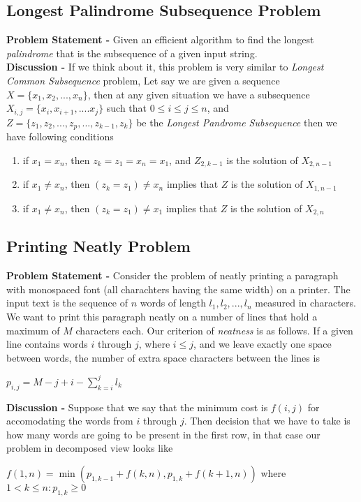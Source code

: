 \documentclass[10pt,a4paper,draft]{article}
\begin{document}
\subsection{Longest Palindrome Subsequence Problem}
\textbf{Problem Statement -} Given an efficient algorithm to find the longest \emph{palindrome} that is the subsequence of a given input string.
\\[12pt]
\textbf{Discussion -} If we think about it, this problem is very similar to \emph{Longest Common Subsequence} problem, Let say we are given a sequence $X = \{x_1,x_2,...,x_n\}$, then at any given situation we have a subsequence $X_{i,j} = \{x_i,x_{i+1},....x_j\}$ such that $0 \leq i \leq j \leq n$, and $Z = \{z_1,z_2,...,z_p,...,z_{k-1},z_k\}$ be the \emph{Longest Pandrome Subsequence} then we have following conditions
\begin{enumerate}
\item if $x_1=x_n$, then $z_k=z_1=x_n=x_1$, and $Z_{2,k-1}$ is the solution of $X_{2,n-1}$ 
\item if $x_1 \neq x_n$, then $(z_k = z_1) \neq x_n$ implies that $Z$ is the solution of $X_{1,n-1}$ 
\item if $x_1 \neq x_n$, then $(z_k = z_1) \neq x_1$ implies that $Z$ is the solution of $X_{2,n}$ 
\end{enumerate}
\subsection{Printing Neatly Problem}
\textbf{Problem Statement -} Consider the problem of neatly printing a paragraph with monospaced font (all charachters having the same width) on a printer. The input text is the sequence of $n$ words of length $l_1,l_2,...,l_n$ measured in characters. We want to print this paragraph neatly on a number of lines that hold a maximum of $M$ characters each. Our criterion of \emph{neatness} is as follows. If a given line contains words $i$ through $j$, where $i \leq j$, and we leave exactly one space between words, the number of extra space characters between the lines is
\begin{center}
$p_{i,j}=M-j+i-\sum\limits_{k=i}^jl_k$
\end{center}
\textbf{Discussion -} Suppose that we say that the minimum cost is $f(i,j)$ for accomodating the words from $i$ through $j$. Then decision that we have to take is how many words are going to be present in the first row, in that case our problem in decomposed view looks like
\begin{center}
$f(1,n)=\min(p_{1,k-1}+f(k,n),p_{1,k}+f(k+1,n))$ where $1 < k \leq n : p_{1,k} \geq 0$
\end{center}
\end{document}
